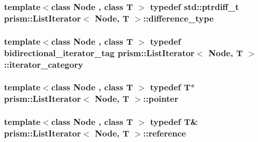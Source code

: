 \subsubsection[{\texorpdfstring{difference\+\_\+type}{difference_type}}]{\setlength{\rightskip}{0pt plus 5cm}template$<$class Node , class T $>$ typedef std\+::ptrdiff\+\_\+t {\bf prism\+::\+List\+Iterator}$<$ Node, T $>$\+::{\bf difference\+\_\+type}}\hypertarget{structprism_1_1_list_iterator_a1353d7adf61676d3913acaa1b00fed94}{}\label{structprism_1_1_list_iterator_a1353d7adf61676d3913acaa1b00fed94}
\subsubsection[{\texorpdfstring{iterator\+\_\+category}{iterator_category}}]{\setlength{\rightskip}{0pt plus 5cm}template$<$class Node , class T $>$ typedef {\bf bidirectional\+\_\+iterator\+\_\+tag} {\bf prism\+::\+List\+Iterator}$<$ Node, T $>$\+::{\bf iterator\+\_\+category}}\hypertarget{structprism_1_1_list_iterator_a3accec188667cc3b84dca49151b83b95}{}\label{structprism_1_1_list_iterator_a3accec188667cc3b84dca49151b83b95}
\subsubsection[{\texorpdfstring{pointer}{pointer}}]{\setlength{\rightskip}{0pt plus 5cm}template$<$class Node , class T $>$ typedef T$\ast$ {\bf prism\+::\+List\+Iterator}$<$ Node, T $>$\+::{\bf pointer}}\hypertarget{structprism_1_1_list_iterator_a7df7f6f08916f0bbe2e0b0ce675e0cee}{}\label{structprism_1_1_list_iterator_a7df7f6f08916f0bbe2e0b0ce675e0cee}
\subsubsection[{\texorpdfstring{reference}{reference}}]{\setlength{\rightskip}{0pt plus 5cm}template$<$class Node , class T $>$ typedef T\& {\bf prism\+::\+List\+Iterator}$<$ Node, T $>$\+::{\bf reference}}\hypertarget{structprism_1_1_list_iterator_a8102dfe3c26bb09d44c54ce276debf69}{}\label{structprism_1_1_list_iterator_a8102dfe3c26bb09d44c54ce276debf69}
